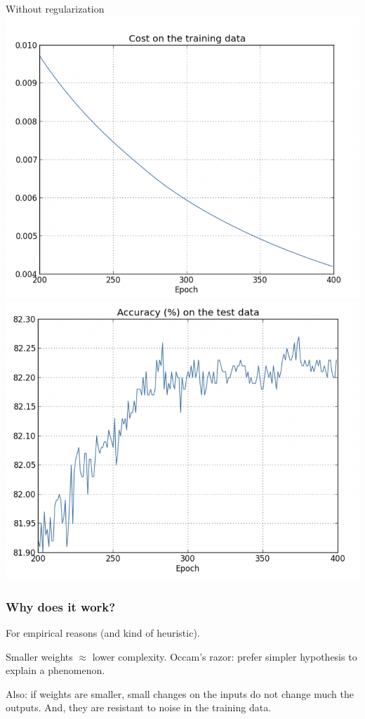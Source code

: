 \documentclass[usenames,dvipsnames]{beamer}
\begin{document}
\begin{frame}
\begin{minipage}{.4\textwidth}
  \begin{center}
  {\tiny Without regularization}
  \includegraphics[scale=.29]{cost-train}
  \includegraphics[scale=.29]{accuracy-test}
  \end{center}	
 \end{minipage}

\end{frame}


\begin{frame}
  \frametitle{Why does it work?}
  
  For empirical reasons (and kind of heuristic).
  
  \begin{alertblock}{}
Smaller weights $\approx$ lower complexity. Occam's razor: prefer simpler hypothesis to explain a phenomenon.
  \end{alertblock}
  
  \medskip
  
  Also: if weights are smaller, small changes on the inputs do not change much the outputs. And, they are resistant to noise in the training data.

  
\end{frame}
\end{document}
